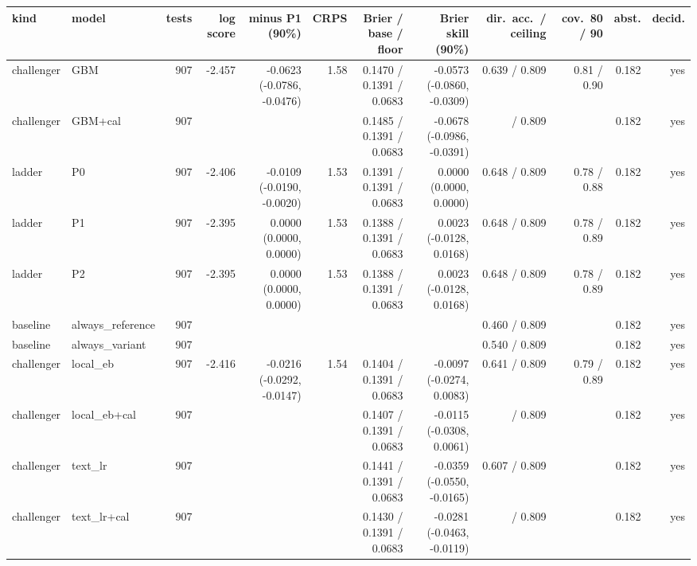 \begin{tabular}{llrrrrrrrrrr}
\toprule
kind & model & tests & log score & minus P1 (90\%) & CRPS & Brier / base / floor & Brier skill (90\%) & dir.\ acc.\ / ceiling & cov.\ 80 / 90 & abst. & decid. \\
\midrule
challenger & GBM & 907 & -2.457 & -0.0623 (-0.0786, -0.0476) & 1.58 & 0.1470 / 0.1391 / 0.0683 & -0.0573 (-0.0860, -0.0309) & 0.639 / 0.809 & 0.81 / 0.90 & 0.182 & yes \\
challenger & GBM+cal & 907 &  &  &  & 0.1485 / 0.1391 / 0.0683 & -0.0678 (-0.0986, -0.0391) &  / 0.809 &  & 0.182 & yes \\
ladder & P0 & 907 & -2.406 & -0.0109 (-0.0190, -0.0020) & 1.53 & 0.1391 / 0.1391 / 0.0683 & 0.0000 (0.0000, 0.0000) & 0.648 / 0.809 & 0.78 / 0.88 & 0.182 & yes \\
ladder & P1 & 907 & -2.395 & 0.0000 (0.0000, 0.0000) & 1.53 & 0.1388 / 0.1391 / 0.0683 & 0.0023 (-0.0128, 0.0168) & 0.648 / 0.809 & 0.78 / 0.89 & 0.182 & yes \\
ladder & P2 & 907 & -2.395 & 0.0000 (0.0000, 0.0000) & 1.53 & 0.1388 / 0.1391 / 0.0683 & 0.0023 (-0.0128, 0.0168) & 0.648 / 0.809 & 0.78 / 0.89 & 0.182 & yes \\
baseline & always\_reference & 907 &  &  &  &  &  & 0.460 / 0.809 &  & 0.182 & yes \\
baseline & always\_variant & 907 &  &  &  &  &  & 0.540 / 0.809 &  & 0.182 & yes \\
challenger & local\_eb & 907 & -2.416 & -0.0216 (-0.0292, -0.0147) & 1.54 & 0.1404 / 0.1391 / 0.0683 & -0.0097 (-0.0274, 0.0083) & 0.641 / 0.809 & 0.79 / 0.89 & 0.182 & yes \\
challenger & local\_eb+cal & 907 &  &  &  & 0.1407 / 0.1391 / 0.0683 & -0.0115 (-0.0308, 0.0061) &  / 0.809 &  & 0.182 & yes \\
challenger & text\_lr & 907 &  &  &  & 0.1441 / 0.1391 / 0.0683 & -0.0359 (-0.0550, -0.0165) & 0.607 / 0.809 &  & 0.182 & yes \\
challenger & text\_lr+cal & 907 &  &  &  & 0.1430 / 0.1391 / 0.0683 & -0.0281 (-0.0463, -0.0119) &  / 0.809 &  & 0.182 & yes \\
\bottomrule
\end{tabular}
